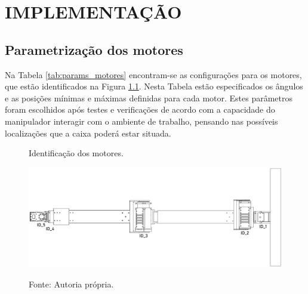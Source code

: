 \chapter{IMPLEMENTAÇÃO}
\label{chap:implementacao}

\section{Parametrização dos motores}
\label{sec:params}

Na Tabela \ref{tab:params_motores} encontram-se as configurações para os motores, que estão identificados na Figura \ref{fig:id_motores}. Nesta Tabela estão especificados os ângulos e as posições mínimas e máximas definidas para cada motor.
Estes parâmetros foram escolhidos após testes e verificações de acordo com a capacidade do manipulador interagir com o ambiente de trabalho, pensando nas possíveis localizações que a caixa poderá estar situada.


\begin{figure}[H]
    \centering
    \caption{Identificação dos motores.}
    \includegraphics[scale=0.25]{images/id_motores.png}
    \label{fig:id_motores}
    \caption*{Fonte: Autoria própria.}
\end{figure}


